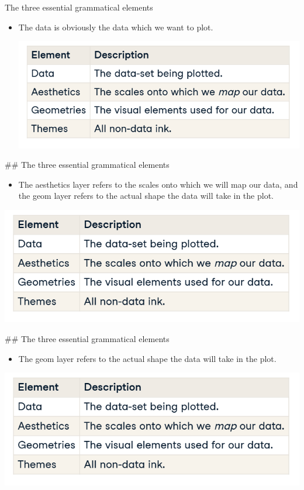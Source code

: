 \documentclass[
  ignorenonframetext,
]{beamer}
\providecommand{\tightlist}{%
  \setlength{\itemsep}{0pt}\setlength{\parskip}{0pt}}
\begin{document}
\begin{frame}{The three essential grammatical elements}
\label{the-three-essential-grammatical-elements-2}
\begin{itemize}
\item
  The data is obviously the data which we want to plot.

  \includegraphics{../images/im123.png}
\end{itemize}

\#\# The three essential grammatical elements

\begin{itemize}
\tightlist
\item
  The aesthetics layer refers to the scales onto which we will map our
  data, and the geom layer refers to the actual shape the data will take
  in the plot.
\end{itemize}

\includegraphics{../images/im123.png}

\#\# The three essential grammatical elements

\begin{itemize}
\tightlist
\item
  The geom layer refers to the actual shape the data will take in the
  plot.
\end{itemize}

\includegraphics{../images/im123.png}
\end{frame}
\end{document}
